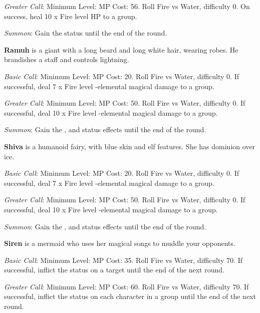 \begin{multicols}{2}
	\textit{Greater Call}: Minimum Level:  MP Cost: 56. Roll Fire vs Water, difficulty 0. On success, heal 10 x Fire level HP to a group.

    \textit{Summon}: Gain the   status until the end of the round.

    \textbf{Ramuh} is a giant with a long beard and long white hair, wearing robes. He brandishes a staff and controls lightning.
    
    \textit{Basic Call}: Minimum Level:  MP Cost: 20. Roll Fire vs Water, difficulty 0. If successful, deal 7 x Fire level -elemental magical damage to a group.
    
    \textit{Greater Call}: Minimum Level:  MP Cost: 50. Roll Fire vs Water, difficulty 0. If successful, deal 10 x Fire level -elemental magical damage to a group.
    
    \textit{Summon}: Gain the  ,   and   status effects until the end of the round.
    
	\textbf{Shiva} is a humanoid fairy, with blue skin and elf features. She has dominion over ice.
    
    \textit{Basic Call}: Minimum Level:  MP Cost: 20. Roll Fire vs Water, difficulty 0. If successful, deal 7 x Fire level -elemental magical damage to a group.
    
    \textit{Greater Call}: Minimum Level:  MP Cost: 50. Roll Fire vs Water, difficulty 0. If successful, deal 10 x Fire level -elemental magical damage to a group.
    
    \textit{Summon}: Gain the  ,   and   status effects until the end of the round.
    
    \textbf{Siren} is a mermaid who uses her magical songs to muddle your opponents.
    
    \textit{Basic Call}: Minimum Level:  MP Cost: 35. Roll Fire vs Water, difficulty 70. If successful, inflict the  status on a target until the end of the next round.
    
    \textit{Greater Call}: Minimum Level:  MP Cost: 60. Roll Fire vs Water, difficulty 70. If successful, inflict the  status on each character in a group until the end of the next round.
    

\end{multicols}
